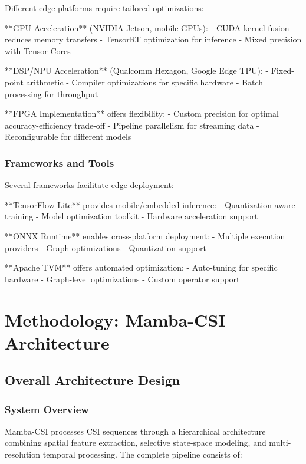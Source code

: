 \documentclass[10pt,journal,compsoc]{IEEEtran}
\begin{document}
Different edge platforms require tailored optimizations:

**GPU Acceleration** (NVIDIA Jetson, mobile GPUs):
- CUDA kernel fusion reduces memory transfers
- TensorRT optimization for inference
- Mixed precision with Tensor Cores

**DSP/NPU Acceleration** (Qualcomm Hexagon, Google Edge TPU):
- Fixed-point arithmetic
- Compiler optimizations for specific hardware
- Batch processing for throughput

**FPGA Implementation** offers flexibility:
- Custom precision for optimal accuracy-efficiency trade-off
- Pipeline parallelism for streaming data
- Reconfigurable for different models

\subsubsection{Frameworks and Tools}

Several frameworks facilitate edge deployment:

**TensorFlow Lite** provides mobile/embedded inference:
- Quantization-aware training
- Model optimization toolkit
- Hardware acceleration support

**ONNX Runtime** enables cross-platform deployment:
- Multiple execution providers
- Graph optimizations
- Quantization support

**Apache TVM** offers automated optimization:
- Auto-tuning for specific hardware
- Graph-level optimizations
- Custom operator support

\section{Methodology: Mamba-CSI Architecture}
\label{sec:methodology}

\subsection{Overall Architecture Design}

\subsubsection{System Overview}

Mamba-CSI processes CSI sequences through a hierarchical architecture combining spatial feature extraction, selective state-space modeling, and multi-resolution temporal processing. The complete pipeline consists of:
\end{document}
